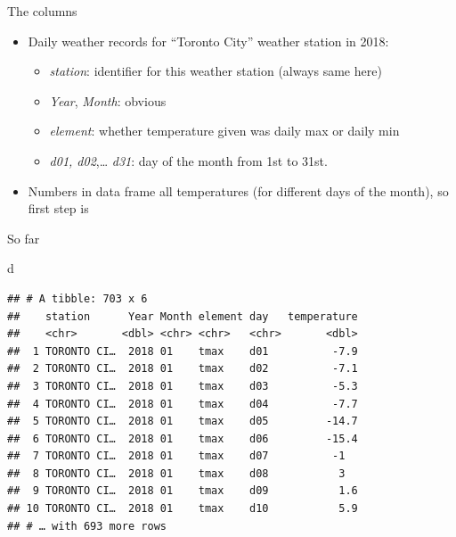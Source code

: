\documentclass[
  ignorenonframetext,
]{beamer}
\newenvironment{Shaded}{\begin{snugshade}}{\end{snugshade}}
\newcommand{\DataTypeTok}[1]{\textcolor[rgb]{0.13,0.29,0.53}{#1}}
\newcommand{\KeywordTok}[1]{\textcolor[rgb]{0.13,0.29,0.53}{\textbf{#1}}}
\newcommand{\NormalTok}[1]{#1}
\newcommand{\OperatorTok}[1]{\textcolor[rgb]{0.81,0.36,0.00}{\textbf{#1}}}
\newcommand{\StringTok}[1]{\textcolor[rgb]{0.31,0.60,0.02}{#1}}
\providecommand{\tightlist}{%
  \setlength{\itemsep}{0pt}\setlength{\parskip}{0pt}}
\begin{document}
\begin{frame}[fragile]{The columns}
\protect\hypertarget{the-columns}{}

\begin{itemize}
\item
  Daily weather records for ``Toronto City'' weather station in 2018:

  \begin{itemize}
  \tightlist
  \item
    \emph{station}: identifier for this weather station (always same
    here)
  \item
    \emph{Year}, \emph{Month}: obvious
  \item
    \emph{element}: whether temperature given was daily max or daily min
  \item
    \emph{d01, d02},\ldots{} \emph{d31}: day of the month from 1st to
    31st.
  \end{itemize}
\item
  Numbers in data frame all temperatures (for different days of the
  month), so first step is
\end{itemize}

\begin{Shaded}
\end{Shaded}

\end{frame}

\begin{frame}[fragile]{So far}
\protect\hypertarget{so-far}{}

\begin{Shaded}
\begin{Highlighting}[]
\NormalTok{d}
\end{Highlighting}
\end{Shaded}

\begin{verbatim}
## # A tibble: 703 x 6
##    station      Year Month element day   temperature
##    <chr>       <dbl> <chr> <chr>   <chr>       <dbl>
##  1 TORONTO CI…  2018 01    tmax    d01          -7.9
##  2 TORONTO CI…  2018 01    tmax    d02          -7.1
##  3 TORONTO CI…  2018 01    tmax    d03          -5.3
##  4 TORONTO CI…  2018 01    tmax    d04          -7.7
##  5 TORONTO CI…  2018 01    tmax    d05         -14.7
##  6 TORONTO CI…  2018 01    tmax    d06         -15.4
##  7 TORONTO CI…  2018 01    tmax    d07          -1  
##  8 TORONTO CI…  2018 01    tmax    d08           3  
##  9 TORONTO CI…  2018 01    tmax    d09           1.6
## 10 TORONTO CI…  2018 01    tmax    d10           5.9
## # … with 693 more rows
\end{verbatim}

\end{frame}
\end{document}

